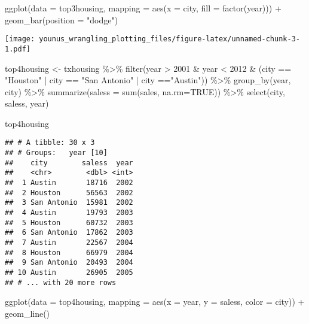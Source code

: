 \documentclass[
]{article}
\newenvironment{Shaded}{\begin{snugshade}}{\end{snugshade}}
\newcommand{\AttributeTok}[1]{\textcolor[rgb]{0.77,0.63,0.00}{#1}}
\newcommand{\ConstantTok}[1]{\textcolor[rgb]{0.00,0.00,0.00}{#1}}
\newcommand{\DecValTok}[1]{\textcolor[rgb]{0.00,0.00,0.81}{#1}}
\newcommand{\FunctionTok}[1]{\textcolor[rgb]{0.00,0.00,0.00}{#1}}
\newcommand{\NormalTok}[1]{#1}
\newcommand{\OtherTok}[1]{\textcolor[rgb]{0.56,0.35,0.01}{#1}}
\newcommand{\SpecialCharTok}[1]{\textcolor[rgb]{0.00,0.00,0.00}{#1}}
\newcommand{\StringTok}[1]{\textcolor[rgb]{0.31,0.60,0.02}{#1}}
\begin{document}
\begin{Shaded}
\begin{Highlighting}[]
\FunctionTok{ggplot}\NormalTok{(}\AttributeTok{data =}\NormalTok{ top3housing, }\AttributeTok{mapping =} \FunctionTok{aes}\NormalTok{(}\AttributeTok{x =}\NormalTok{ city, }\AttributeTok{fill =} \FunctionTok{factor}\NormalTok{(year))) }\SpecialCharTok{+} 
  \FunctionTok{geom\_bar}\NormalTok{(}\AttributeTok{position =} \StringTok{"dodge"}\NormalTok{) }
\end{Highlighting}
\end{Shaded}

\texttt{[image: younus\_wrangling\_plotting\_files/figure-latex/unnamed-chunk-3-1.pdf]}

\begin{Shaded}
\begin{Highlighting}[]
\NormalTok{top4housing }\OtherTok{\textless{}{-}}\NormalTok{ txhousing }\SpecialCharTok{\%\textgreater{}\%}
  \FunctionTok{filter}\NormalTok{(year }\SpecialCharTok{\textgreater{}} \DecValTok{2001} \SpecialCharTok{\&}\NormalTok{ year }\SpecialCharTok{\textless{}} \DecValTok{2012} \SpecialCharTok{\&}\NormalTok{ (city }\SpecialCharTok{==} \StringTok{"Houston"} \SpecialCharTok{|}\NormalTok{ city }\SpecialCharTok{==} \StringTok{"San Antonio"} \SpecialCharTok{|}\NormalTok{ city }\SpecialCharTok{==}\StringTok{"Austin"}\NormalTok{)) }\SpecialCharTok{\%\textgreater{}\%}
  \FunctionTok{group\_by}\NormalTok{(year, city) }\SpecialCharTok{\%\textgreater{}\%}
  \FunctionTok{summarize}\NormalTok{(}\AttributeTok{saless =} \FunctionTok{sum}\NormalTok{(sales, }\AttributeTok{na.rm=}\ConstantTok{TRUE}\NormalTok{)) }\SpecialCharTok{\%\textgreater{}\%}
  \FunctionTok{select}\NormalTok{(city, saless, year)}

\NormalTok{top4housing}
\end{Highlighting}
\end{Shaded}

\begin{verbatim}
## # A tibble: 30 x 3
## # Groups:   year [10]
##    city        saless  year
##    <chr>        <dbl> <int>
##  1 Austin       18716  2002
##  2 Houston      56563  2002
##  3 San Antonio  15981  2002
##  4 Austin       19793  2003
##  5 Houston      60732  2003
##  6 San Antonio  17862  2003
##  7 Austin       22567  2004
##  8 Houston      66979  2004
##  9 San Antonio  20493  2004
## 10 Austin       26905  2005
## # ... with 20 more rows
\end{verbatim}

\begin{Shaded}
\begin{Highlighting}[]
\FunctionTok{ggplot}\NormalTok{(}\AttributeTok{data =}\NormalTok{ top4housing, }\AttributeTok{mapping =} \FunctionTok{aes}\NormalTok{(}\AttributeTok{x =}\NormalTok{ year, }\AttributeTok{y =}\NormalTok{ saless, }\AttributeTok{color =}\NormalTok{ city)) }\SpecialCharTok{+} 
  \FunctionTok{geom\_line}\NormalTok{() }
\end{Highlighting}
\end{Shaded}
\end{document}
